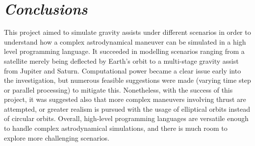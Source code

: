 \documentclass[12pt, english]{report}
\makeatletter
\renewcommand{\cftchappresnum}{Chapter }
\newcommand*\updatechaptername{%
	\addtocontents{toc}{\protect\renewcommand*\protect\cftchappresnum{\@chapapp\ }}
}
\renewcommand{\thefigure}{\Roman{chapter}.\arabic{figure}}
\renewcommand{\thetable}{\Roman{chapter}.\arabic{table}}
\makeatother
\begin{document}
\chapter{\textsl{Conclusions}}

\normalsize{\noindent This project aimed to simulate gravity assists under different scenarios in order to understand how a complex astrodynamical maneuver can be simulated in a high level programming language. It succeeded in modelling scenarios ranging from a satellite merely being deflected by Earth's orbit to a multi-stage gravity assist from Jupiter and Saturn. Computational power became a clear issue early into the investigation, but numerous feasible suggestions were made (varying time step or parallel processing) to mitigate this. Nonetheless, with the success of this project, it was suggested also that more complex maneuvers involving thrust are attempted, or greater realism is pursued with the usage of elliptical orbits instead of circular orbits. Overall, high-level programming languages are versatile enough to handle complex astrodynamical simulations, and there is much room to explore more challenging scenarios.}

%


\printbibliography
\clearpage

\renewcommand{\thefigure}{\Alph{chapter}.\arabic{figure}}
\renewcommand{\thetable}{\Alph{chapter}.\arabic{table}}

\updatechaptername
%
\end{document}
